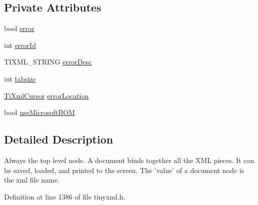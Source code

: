 \subsection*{Private Attributes}
\begin{DoxyCompactItemize}
\item 
bool \hyperlink{classTiXmlDocument_a1ff6a063602f31acae6f37fc049d8bbd}{error}
\item 
int \hyperlink{classTiXmlDocument_acdef97a4bb80729ac6863dd54cee7eeb}{errorId}
\item 
TIXML\_\-STRING \hyperlink{classTiXmlDocument_a2da9a95ba3f9c895a8d7f4de7122a642}{errorDesc}
\item 
int \hyperlink{classTiXmlDocument_af2fa6a010b903d893d52cc6fee5575a1}{tabsize}
\item 
\hyperlink{structTiXmlCursor}{TiXmlCursor} \hyperlink{classTiXmlDocument_aa4030f989f1549f6b897147fc2851d1a}{errorLocation}
\item 
bool \hyperlink{classTiXmlDocument_a4d5400dec9bfb55c640428de33297886}{useMicrosoftBOM}
\end{DoxyCompactItemize}


\subsection{Detailed Description}
Always the top level node. A document binds together all the XML pieces. It can be saved, loaded, and printed to the screen. The 'value' of a document node is the xml file name. 

Definition at line 1386 of file tinyxml.h.



